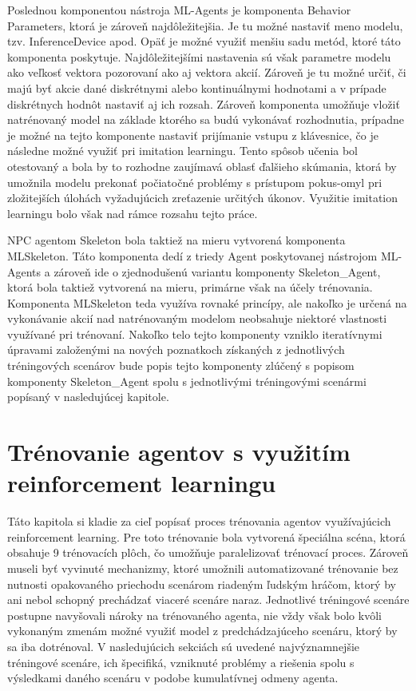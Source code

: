 \documentclass[slovak, master]{diploma}
\begin{document}
Poslednou komponentou nástroja ML-Agents je komponenta Behavior Parameters, ktorá je zároveň najdôležitejšia. Je tu možné nastaviť meno modelu, tzv. InferenceDevice apod. Opäť je možné využiť menšiu sadu metód, ktoré táto komponenta poskytuje. Najdôležitejšími nastavenia sú však parametre modelu ako veľkosť vektora pozorovaní ako aj vektora akcií. Zároveň je tu možné určiť, či majú byť akcie dané diskrétnymi alebo kontinuálnymi hodnotami a v prípade diskrétnych hodnôt nastaviť aj ich rozsah. Zároveň komponenta umožňuje vložiť natrénovaný model na základe ktorého sa budú vykonávať rozhodnutia, prípadne je možné na tejto komponente nastaviť prijímanie vstupu z klávesnice, čo je následne možné využiť pri imitation learningu. Tento spôsob učenia bol otestovaný a bola by to rozhodne zaujímavá oblasť ďalšieho skúmania, ktorá by umožnila modelu prekonať počiatočné problémy s prístupom pokus-omyl pri zložitejších úlohách vyžadujúcich zreťazenie určitých úkonov. Využitie imitation learningu bolo však nad rámce rozsahu tejto práce.

NPC agentom Skeleton bola taktiež na mieru vytvorená komponenta MLSkeleton. Táto komponenta dedí z triedy Agent poskytovanej nástrojom ML-Agents a zároveň ide o zjednodušenú variantu komponenty Skeleton\_Agent, ktorá bola taktiež vytvorená na mieru, primárne však na účely trénovania. Komponenta MLSkeleton teda využíva rovnaké princípy, ale nakoľko je určená na vykonávanie akcií nad natrénovaným modelom neobsahuje niektoré vlastnosti využívané pri trénovaní. Nakoľko telo tejto komponenty vzniklo iteratívnymi úpravami založenými na nových poznatkoch získaných z jednotlivých tréningových scenárov bude popis tejto komponenty zlúčený s popisom komponenty Skeleton\_Agent spolu s jednotlivými tréningovými scenármi popísaný v nasledujúcej kapitole.

\chapter{Trénovanie agentov s využitím reinforcement learningu}
\label{sec:Training}
Táto kapitola si kladie za cieľ popísať proces trénovania agentov využívajúcich reinforcement learning. Pre toto trénovanie bola vytvorená špeciálna scéna, ktorá obsahuje 9 trénovacích plôch, čo umožňuje paralelizovať trénovací proces. Zároveň museli byť vyvinuté mechanizmy, ktoré umožnili automatizované trénovanie bez nutnosti opakovaného priechodu scenárom riadeným ľudským hráčom, ktorý by ani nebol schopný prechádzať viaceré scenáre naraz. Jednotlivé tréningové scenáre postupne navyšovali nároky na trénovaného agenta, nie vždy však bolo kvôli vykonaným zmenám možné využiť model z predchádzajúceho scenáru, ktorý by sa iba dotrénoval. V nasledujúcich sekciách sú uvedené najvýznamnejšie tréningové scenáre, ich špecifiká, vzniknuté problémy a riešenia spolu s výsledkami daného scenáru v podobe kumulatívnej odmeny agenta.
\end{document}
